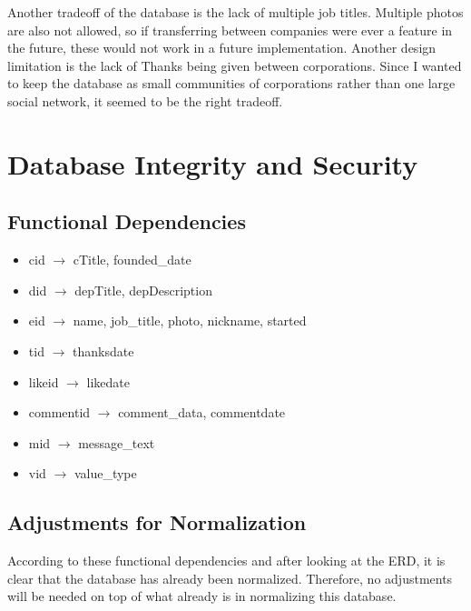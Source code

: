 \documentclass[11pt]{report}
\begin{document}
Another tradeoff of the database is the lack of multiple job titles. Multiple photos are also not allowed, so if transferring between companies were ever a feature in the future, these would not work in a future implementation. Another design limitation is the lack of Thanks being given between corporations. Since I wanted to keep the database as small communities of corporations rather than one large social network, it seemed to be the right tradeoff.
\clearpage

\chapter{Database Integrity and Security}

\section{Functional Dependencies}
\begin{itemize}
\item cid $\rightarrow$ cTitle, founded\_date
\item did $\rightarrow$ depTitle, depDescription
\item eid $\rightarrow$ name, job\_title, photo, nickname, started
\item tid $\rightarrow$ thanksdate
\item likeid $\rightarrow$ likedate
\item commentid $\rightarrow$ comment\_data, commentdate
\item mid $\rightarrow$ message\_text
\item vid $\rightarrow$ value\_type
\end{itemize}
\section{Adjustments for Normalization}
According to these functional dependencies and after looking at the ERD, it is clear that the database has already been normalized. Therefore, no adjustments will be needed on top of what already is in normalizing this database.
\end{document}
